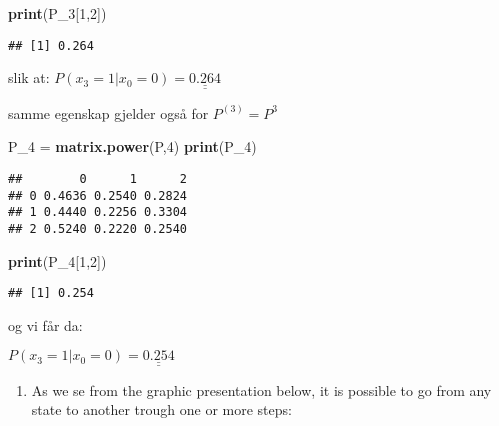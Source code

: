 \documentclass[]{article}
\newenvironment{Shaded}{\begin{snugshade}}{\end{snugshade}}
\newcommand{\DecValTok}[1]{\textcolor[rgb]{0.00,0.00,0.81}{#1}}
\newcommand{\KeywordTok}[1]{\textcolor[rgb]{0.13,0.29,0.53}{\textbf{#1}}}
\newcommand{\NormalTok}[1]{#1}
\newcommand{\StringTok}[1]{\textcolor[rgb]{0.31,0.60,0.02}{#1}}
\providecommand{\tightlist}{%
  \setlength{\itemsep}{0pt}\setlength{\parskip}{0pt}}
\begin{document}
\begin{Shaded}
\begin{Highlighting}[]
\KeywordTok{print}\NormalTok{(P_}\DecValTok{3}\NormalTok{[}\DecValTok{1}\NormalTok{,}\DecValTok{2}\NormalTok{])}
\end{Highlighting}
\end{Shaded}

\begin{verbatim}
## [1] 0.264
\end{verbatim}

slik at: \(P(x_{3}=1|x_{0}=0) = \underline{\underline{0.264}}\)

samme egenskap gjelder også for \(P^{(3)}=P^{3}\)

\begin{Shaded}
\begin{Highlighting}[]
\NormalTok{P_}\DecValTok{4}\NormalTok{ =}\StringTok{ }\KeywordTok{matrix.power}\NormalTok{(P,}\DecValTok{4}\NormalTok{)}
\KeywordTok{print}\NormalTok{(P_}\DecValTok{4}\NormalTok{)}
\end{Highlighting}
\end{Shaded}

\begin{verbatim}
##        0      1      2
## 0 0.4636 0.2540 0.2824
## 1 0.4440 0.2256 0.3304
## 2 0.5240 0.2220 0.2540
\end{verbatim}

\begin{Shaded}
\begin{Highlighting}[]
\KeywordTok{print}\NormalTok{(P_}\DecValTok{4}\NormalTok{[}\DecValTok{1}\NormalTok{,}\DecValTok{2}\NormalTok{])}
\end{Highlighting}
\end{Shaded}

\begin{verbatim}
## [1] 0.254
\end{verbatim}

og vi får da:

\(P(x_{3}=1|x_{0}=0) = \underline{\underline{0.254}}\)

\begin{enumerate}
\def\labelenumi{\alph{enumi})}
\setcounter{enumi}{1}
\tightlist
\item
  As we se from the graphic presentation below, it is possible to go
  from any state to another trough one or more steps:
\end{enumerate}
\end{document}
